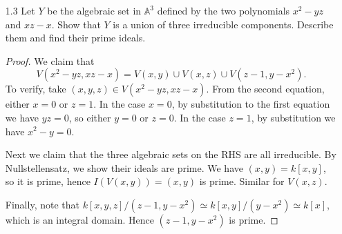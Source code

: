 \begin{enumerate}
\begin{proof}
				 Finally, we explicitly show the isomorphism $A(Y) \simeq k[x]$. Define the homomorphism
				 \begin{align*}
					 \phi: A &\longrightarrow k[t] \\
				 	x &\longmapsto t \\
				 	y &\longmapsto t^2 \\
				 	z &\longmapsto t^3
				 .\end{align*}
				 First of all, $\phi(y - x^2) = t^2 - t^2 = 0$ and similarly $\phi(z - x^3) = 0$, hence $I(Y) \subset \operatorname{ker}  \phi$. We would like to show $I(Y) = \operatorname{ker} \phi$. Take $f(x,y,z) \in  \operatorname{ker} \phi$, then $f(t, t^2, t^3) = 0$. But then $f \in I(Y)$ by definition.
				 Thus we have shown that $I(Y) = \operatorname{ker} \phi$. Finally the first homomorphism theorem gives us $A(Y) = A / \operatorname{ker} \phi \simeq k[t]$.
			 \end{proof}
		 \item [1.3]
			Let $Y$ be the algebraic set in  $\mathbb{A}^3$ defined by the two polynomials $x^2 - yz$ and $xz - x$. Show that $Y$ is a union of three irreducible components. Describe them and find their prime ideals.
			\begin{proof}
				We claim that 
				\[
					V(x^2 - yz, xz - x) = V(x, y) \cup V(x,z) \cup V(z-1, y-x^2)
				.\] 
				To verify, take $(x,y,z) \in V(x^2 - yz, xz - x)$. From the second equation, either $x = 0$ or $z = 1$. In the case $x = 0$, by substitution to the first equation we have $yz = 0$, so either $y = 0$ or $z = 0$. In the case $z = 1$, by substitution we have $x^2 - y = 0$.

				Next we claim that the three algebraic sets on the RHS are all irreducible. By Nullstellensatz, we show their ideals are prime. 
				We have $(x,y) = k[x, y]$, so it is prime, hence  $I(V(x,y)) = (x,y)$ is prime. Similar for $V(x,z)$.

				Finally, note that $k[x,y,z] / (z-1, y-x^2) \simeq k[x,y] / (y - x^2) \simeq k[x]$, which is an integral domain. Hence $(z-1, y-x^2)$ is prime. 
			\end{proof}
			
			 
			
		
\end{enumerate}
